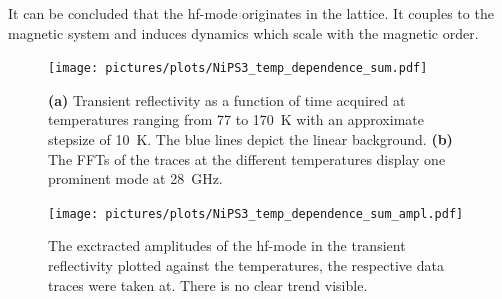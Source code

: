 It can be concluded that the hf-mode originates in the lattice.
It couples to the magnetic system and induces dynamics which scale with the magnetic order.
\begin{figure}[hbt!]
    \centering
    \texttt{[image: pictures/plots/NiPS3\_temp\_dependence\_sum.pdf]} \vspace{-0.3cm}
    \caption{\textbf{(a)} Transient reflectivity as a function of time acquired at temperatures ranging from 77 to \qty{170}{K} with an approximate stepsize of \qty{10}{K}. The blue lines depict the linear background. \textbf{(b)} The FFTs of the traces at the different temperatures display one prominent mode at \qty{28}{GHz}.}
    \label{fig:NiPS3_temp_dependence_sum}
\end{figure}
\begin{figure}[hbt!]
    \centering  
    \texttt{[image: pictures/plots/NiPS3\_temp\_dependence\_sum\_ampl.pdf]} \vspace{-0.3cm}
    \caption{The exctracted amplitudes of the hf-mode in the transient reflectivity plotted against the temperatures, the respective data traces were taken at. There is no clear trend visible.}
    \label{fig:NiPS3_temp_dependence_sum_ampl}
\end{figure}
\FloatBarrier


